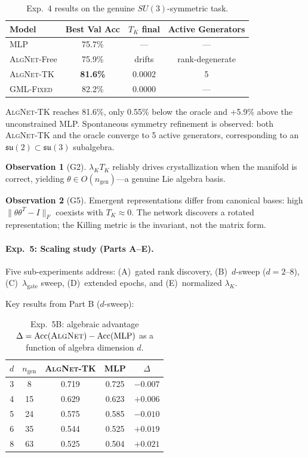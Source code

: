 \documentclass[11pt,a4paper]{article}
\newcommand{\fksu}{\mathfrak{su}}
\newcommand{\TK}{T_K}
\newcommand{\ngen}{n_{\mathrm{gen}}}
\newcommand{\AlgNet}{\textsc{AlgNet}}
\newcommand{\GMLFixed}{\textsc{GML-Fixed}}
\theoremstyle{definition}
\newtheorem{observation}{Observation}
\begin{document}
\begin{table}[H]
\centering
\caption{Exp.~4 results on the genuine $SU(3)$-symmetric task.}
\label{tab:exp4}
\begin{tabular}{lccc}
\toprule
Model & Best Val Acc & $\TK$ final & Active Generators \\
\midrule
MLP            & 75.7\% & ---    & --- \\
\AlgNet{}-Free & 75.9\% & drifts & rank-degenerate \\
\AlgNet{}-TK   & \textbf{81.6\%} & 0.0002 & 5 \\
\GMLFixed{}     & 82.2\% & 0.0000 & --- \\
\bottomrule
\end{tabular}
\end{table}

\AlgNet{}-TK reaches 81.6\%, only 0.55\% below the oracle and +5.9\% 
above the unconstrained MLP. Spontaneous symmetry refinement is observed: 
both \AlgNet{}-TK and the oracle converge to 5 active generators, 
corresponding to an $\fksu(2) \subset \fksu(3)$ subalgebra.

\begin{observation}[G2]
$\lambda_K \TK$ reliably drives crystallization when the manifold is 
correct, yielding $\theta \in O(\ngen)$---a genuine Lie algebra basis.
\end{observation}

\begin{observation}[G5]
Emergent representations differ from canonical bases: high 
$\|\theta\theta^T - I\|_F$ coexists with $\TK \approx 0$. The network 
discovers a rotated representation; the Killing metric is the invariant, 
not the matrix form.
\end{observation}

\paragraph{Exp.~5: Scaling study (Parts A--E).}
Five sub-experiments address: (A)~gated rank discovery, (B)~$d$-sweep 
($d = 2$--$8$), (C)~$\lambda_{\mathrm{gate}}$ sweep, (D)~extended 
epochs, and (E)~normalized $\lambda_K$.

Key results from Part B ($d$-sweep):

\begin{table}[H]
\centering
\caption{Exp.~5B: algebraic advantage $\Delta = \text{Acc}(\AlgNet) 
- \text{Acc}(\text{MLP})$ as a function of algebra dimension $d$.}
\label{tab:exp5b}
\begin{tabular}{ccccc}
\toprule
$d$ & $\ngen$ & \AlgNet{}-TK & MLP & $\Delta$ \\
\midrule
3 & 8  & 0.719 & 0.725 & $-0.007$ \\
4 & 15 & 0.629 & 0.623 & $+0.006$ \\
5 & 24 & 0.575 & 0.585 & $-0.010$ \\
6 & 35 & 0.544 & 0.525 & $+0.019$ \\
8 & 63 & 0.525 & 0.504 & $+0.021$ \\
\bottomrule
\end{tabular}
\end{table}
\end{document}
